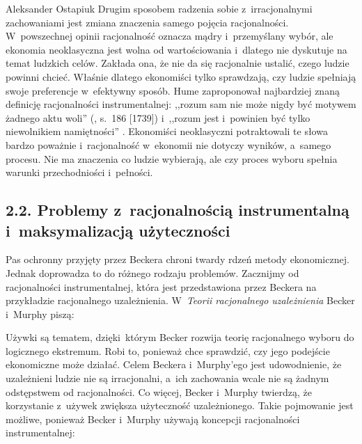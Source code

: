 \begin{artplenv}{Aleksander Ostapiuk}
Drugim sposobem radzenia sobie z~irracjonalnymi zachowaniami jest zmiana znaczenia samego pojęcia racjonalności.
W~powszechnej opinii racjonalność oznacza mądry i~przemyślany wybór, ale ekonomia neoklasyczna jest wolna od
wartościowania i~dlatego nie dyskutuje na temat ludzkich celów. Zakłada ona, że nie da się racjonalnie ustalić, czego
ludzie powinni chcieć. Właśnie dlatego ekonomiści tylko sprawdzają, czy ludzie spełniają swoje preferencje w~efektywny
sposób. Hume zaproponował najbardziej znaną definicję racjonalności instrumentalnej: ,,rozum sam nie może nigdy być
motywem żadnego aktu woli''
(\cite{hume_traktat_1963}, s.~186 [1739])
i~,,rozum
jest i~powinien być tylko niewolnikiem namiętności''
\parencite[s.~188]{hume_traktat_1963}.
Ekonomiści neoklasyczni
potraktowali te słowa bardzo poważnie i~racjonalność w~ekonomii nie dotyczy wyników, a~samego procesu. Nie ma znaczenia
co ludzie wybierają, ale czy proces wyboru spełnia warunki przechodniości i~pełności.

\subsection{2.2. Problemy z~racjonalnością instrumentalną i~maksymalizacją użyteczności}
Pas ochronny przyjęty przez Beckera chroni twardy rdzeń metody ekonomicznej. Jednak doprowadza to do różnego rodzaju
problemów. Zacznijmy od racjonalności instrumentalnej, która jest przedstawiona przez Beckera na przykładzie
racjonalnego uzależnienia. W~\textit{Teorii racjonalnego uzależnienia} Becker i~Murphy piszą: 


Używki są tematem, dzięki~którym Becker rozwija teorię racjonalnego wyboru do logicznego ekstremum. Robi to, ponieważ chce
sprawdzić, czy jego podejście ekonomiczne może działać. Celem Beckera i~Murphy'ego jest udowodnienie, że uzależnieni ludzie nie
są irracjonalni, a~ich zachowania wcale nie są żadnym odstępstwem od racjonalności. Co więcej, Becker i~Murphy
twierdzą, że korzystanie z~używek zwiększa użyteczność uzależnionego. Takie pojmowanie jest możliwe, ponieważ
Becker i~Murphy używają koncepcji racjonalności instrumentalnej: 


\end{artplenv}
